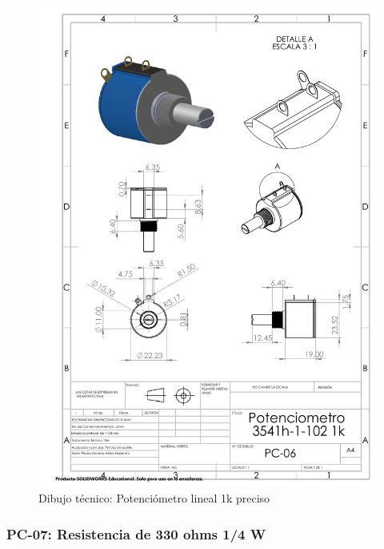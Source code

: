     \begin{figure}[H]
        \centering
        \includegraphics[trim = {7mm 1mm 1mm 1mm},clip,scale=0.4]{22/Img/potenciometroDibujo.PDF}
        \caption{Dibujo técnico: Potenciómetro lineal 1k preciso}
        \label{fig:potenciometro}
    \end{figure}
    
    
    \subsubsection{PC-07: Resistencia de 330 ohms 1/4 W }
    
